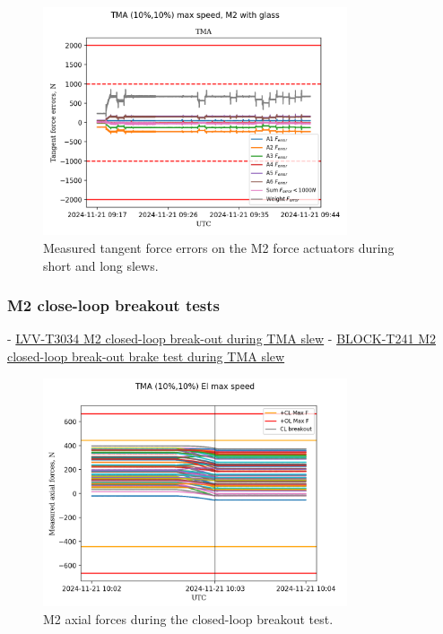 \begin{figure}
    \centering
    \includegraphics[width=0.8\textwidth]{spa/M2_short_long_slews_tangent_force_errors_10.png}
    \caption{Measured tangent force errors on the M2 force actuators during short and long slews.}
    \label{fig:m2_short_long_slews_tangent_errors}
    \end{figure}

\subsubsection{M2 close-loop breakout tests}
\label{subsubsec:m2_close_loop_breakout_tests}

\begin{itemize}
    - \href{https://rubinobs.atlassian.net/projects/LVV?selectedItem=com.atlassian.plugins.atlassian-connect-plugin:com.kanoah.test-manager__main-project-page#!/v2/testCase/LVV-T3034}{LVV-T3034 M2 closed-loop break-out during TMA slew}
    - \href{https://rubinobs.atlassian.net/projects/BLOCK?selectedItem=com.atlassian.plugins.atlassian-connect-plugin:com.kanoah.test-manager__main-project-page#!/v2/testCase/BLOCK-T241}{BLOCK-T241 M2 closed-loop break-out brake test during TMA slew}
\end{itemize}

\begin{figure}
    \centering
    \includegraphics[width=0.8\textwidth]{spa/M2_cl_breakout_10_axial_force.png}
    \caption{M2 axial forces during the closed-loop breakout test.}
    \label{fig:m2_closed_loop_breakout_axial_force}
    \end{figure}

